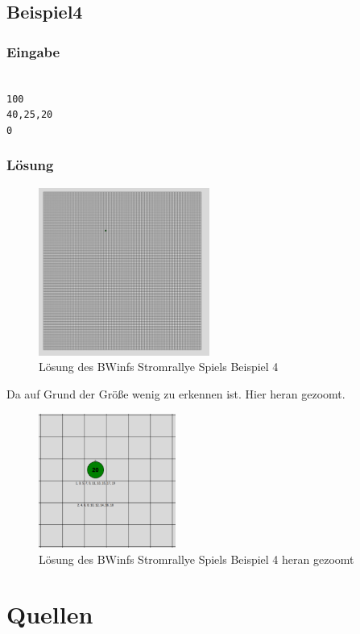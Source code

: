 \documentclass[a4paper,12pt,arial]{scrartcl}
\begin{document}
\subsection{Beispiel4}
\subsubsection{Eingabe}
\texttt{ \\
100 \\
40,25,20 \\
0 \\
}
\subsubsection{Lösung}
\begin{figure}[h]
    \centering
    \includegraphics[width=0.5\textwidth]{solution4.png}
    \caption{Lösung des BWinfs Stromrallye Spiels Beispiel 4}
    \label{fig:loesung4}
\end{figure}
Da auf Grund der Größe wenig zu erkennen ist.
Hier heran gezoomt.
\begin{figure}[h]
    \centering
    \includegraphics[width=0.4\textwidth]{solution_4_zoomed.pdf}
    \caption{Lösung des BWinfs Stromrallye Spiels Beispiel 4 heran gezoomt}
    \label{fig:loesung4_zoomed}
\end{figure}
\newpage

\section{Quellen}
\end{document}
